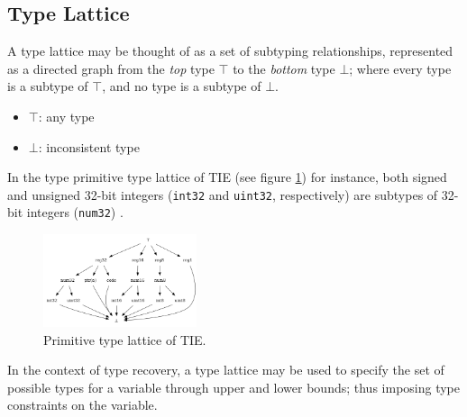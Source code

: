 
\subsection{Type Lattice}

A type lattice may be thought of as a set of subtyping relationships, represented as a directed graph from the \textit{top} type $\top$ to the \textit{bottom} type $\bot$; where every type is a subtype of $\top$, and no type is a subtype of $\bot$.

\begin{itemize}
	\item $\top$: any type
	\item $\bot$: inconsistent type
\end{itemize}

In the type primitive type lattice of TIE (see figure \ref{fig:primitive_type_lattice}) for instance, both signed and unsigned 32-bit integers (\texttt{int32} and \texttt{uint32}, respectively) are subtypes of 32-bit integers (\texttt{num32}) \cite{tie_reverse_engineering_of_types}.

\begin{figure}[htbp]
	\centering
	\includegraphics[width=0.40\textwidth]{inc/tie_primitive_type_lattice.png}
	\caption{Primitive type lattice of TIE.}
	\label{fig:primitive_type_lattice}
\end{figure}

In the context of type recovery, a type lattice may be used to specify the set of possible types for a variable through upper and lower bounds; thus imposing type constraints on the variable.
